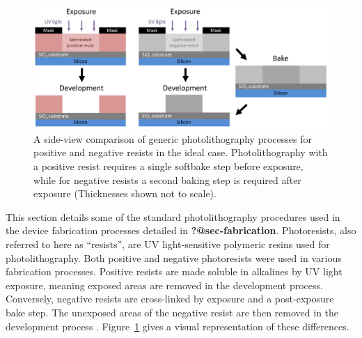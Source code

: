 \documentclass[
  a4paper,
]{scrbook}
\begin{document}
\begin{figure}

{\centering \includegraphics{./figures/app1/positive-negative-photolithography.png}

}

\caption{\label{fig-photolithography-types}A side-view comparison of
generic photolithography processes for positive and negative resists in
the ideal case. Photolithography with a positive resist requires a
single softbake step before exposure, while for negative resists a
second baking step is required after exposure (Thicknesses shown not to
scale).}

\end{figure}

This section details some of the standard photolithography procedures
used in the device fabrication processes detailed in
\textbf{?@sec-fabrication}. Photoresists, also referred to here as
``resists'', are UV light-sensitive polymeric resins used for
photolithography. Both positive and negative photoresists were used in
various fabrication processes. Positive resists are made soluble in
alkalines by UV light exposure, meaning exposed areas are removed in the
development process. Conversely, negative resists are cross-linked by
exposure and a post-exposure bake step. The unexposed areas of the
negative resist are then removed in the development process
\autocite{Microchemicals}. Figure~\ref{fig-photolithography-types} gives
a visual representation of these differences.
\end{document}
